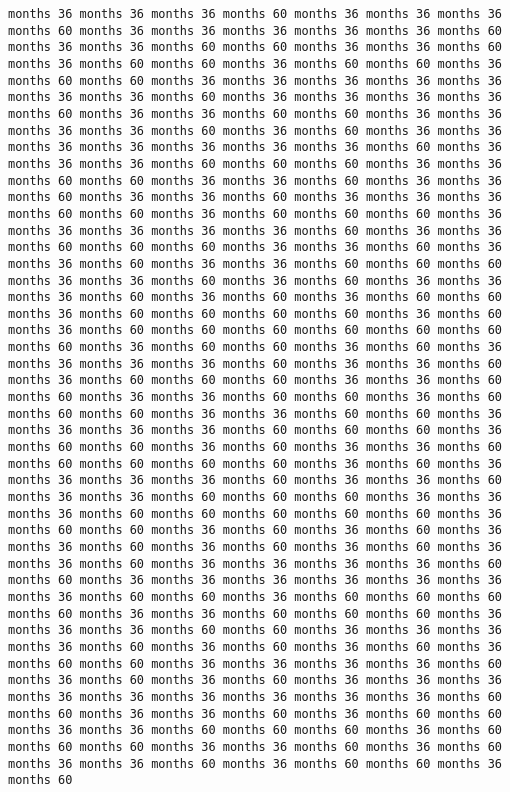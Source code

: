 \documentclass[11pt]{article}
\begin{document}
\begin{Verbatim}[commandchars=\\\{\}, frame=single, framerule=2mm, rulecolor=\color{outerrorbackground}]
months 36 months 36 months 36 months 60 months 36 months 36 months 36 months 60 months 36 months 36 months 36 months 36 months 36 months 60 months 36 months 36 months 60 months 60 months 36 months 36 months 60 months 36 months 60 months 60 months 36 months 60 months 60 months 36 months 60 months 60 months 36 months 36 months 36 months 36 months 36 months 36 months 36 months 60 months 36 months 36 months 36 months 36 months 60 months 36 months 36 months 60 months 60 months 36 months 36 months 36 months 36 months 60 months 36 months 60 months 36 months 36 months 36 months 36 months 36 months 36 months 36 months 60 months 36 months 36 months 36 months 60 months 60 months 60 months 36 months 36 months 60 months 60 months 36 months 36 months 60 months 36 months 36 months 60 months 36 months 36 months 60 months 36 months 36 months 36 months 60 months 60 months 36 months 60 months 60 months 60 months 36 months 36 months 36 months 36 months 36 months 60 months 36 months 36 months 60 months 60 months 60 months 36 months 36 months 60 months 36 months 36 months 60 months 36 months 36 months 60 months 60 months 60 months 36 months 36 months 60 months 36 months 60 months 36 months 36 months 36 months 60 months 36 months 60 months 36 months 60 months 60 months 36 months 60 months 60 months 60 months 60 months 36 months 60 months 36 months 60 months 60 months 60 months 60 months 60 months 60 months 60 months 36 months 60 months 60 months 36 months 60 months 36 months 36 months 36 months 36 months 60 months 36 months 36 months 60 months 36 months 60 months 60 months 60 months 36 months 36 months 60 months 60 months 36 months 36 months 60 months 60 months 36 months 60 months 60 months 60 months 36 months 36 months 60 months 60 months 36 months 36 months 36 months 36 months 60 months 60 months 60 months 36 months 60 months 60 months 36 months 60 months 36 months 36 months 60 months 60 months 60 months 60 months 60 months 36 months 60 months 36 months 36 months 36 months 36 months 60 months 36 months 36 months 60 months 36 months 36 months 60 months 60 months 60 months 36 months 36 months 36 months 60 months 60 months 60 months 60 months 60 months 36 months 60 months 60 months 36 months 60 months 36 months 60 months 36 months 36 months 60 months 36 months 60 months 36 months 60 months 36 months 36 months 60 months 36 months 36 months 36 months 36 months 60 months 60 months 36 months 36 months 36 months 36 months 36 months 36 months 36 months 60 months 60 months 36 months 60 months 60 months 60 months 60 months 36 months 36 months 60 months 60 months 60 months 36 months 36 months 36 months 60 months 60 months 36 months 36 months 36 months 36 months 60 months 36 months 60 months 36 months 60 months 36 months 60 months 60 months 36 months 36 months 36 months 36 months 60 months 36 months 60 months 36 months 60 months 36 months 36 months 36 months 36 months 36 months 36 months 36 months 36 months 36 months 60 months 60 months 36 months 36 months 60 months 36 months 60 months 60 months 36 months 36 months 60 months 60 months 60 months 36 months 60 months 60 months 60 months 36 months 36 months 60 months 36 months 60 months 36 months 36 months 60 months 36 months 60 months 60 months 36 months 60 
\end{Verbatim}
\end{document}
